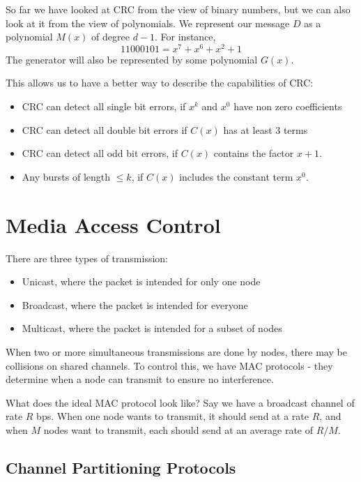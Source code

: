 \documentclass[12pt,letterpaper]{book}
\theoremstyle{definition}
\begin{document}
So far we have looked at CRC from the view of binary numbers, but we can also look at it from the view of polynomials. We represent our message $D$ as a polynomial $M(x)$ of degree $d-1$. For instance,
\[11000101 = x^7 + x^6 + x^2 + 1\]
The generator will also be represented by some polynomial $G(x)$.

This allows us to have a better way to describe the capabilities of CRC:
\begin{itemize}
  \item CRC can detect all single bit errors, if $x^k$ and $x^0$ have non zero coefficients
  \item CRC can detect all double bit errors if $C(x)$ has at least 3 terms
  \item CRC can detect all odd bit errors, if $C(x)$ contains the factor $x+1$.
  \item Any bursts of length $\leq k$, if $C(x)$ includes the constant term $x^0$.
\end{itemize}

\section{Media Access Control}

There are three types of transmission:
\begin{itemize}
  \item Unicast, where the packet is intended for only one node
  \item Broadcast, where the packet is intended for everyone
  \item Multicast, where the packet is intended for a subset of nodes
\end{itemize}

When two or more simultaneous transmissions are done by nodes, there may be collisions on shared channels. To control this, we have MAC protocols - they determine when a node can transmit to ensure no interference.

What does the ideal MAC protocol look like? Say we have a broadcast channel of rate $R$ bps. When one node wants to transmit, it should send at a rate $R$, and when $M$ nodes want to transmit, each should send at an average rate of $R/M$.

\subsection{Channel Partitioning Protocols}
\end{document}
